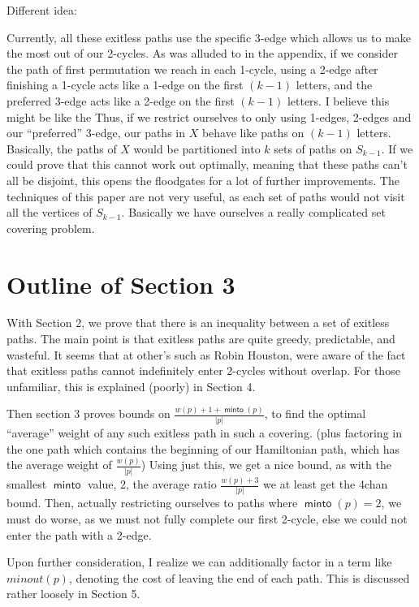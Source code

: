 \documentclass{article}
\DeclareMathOperator{\minto}{\bm{\mathsf{minto}}}
\begin{document}
Different idea:

Currently, all these exitless paths use the specific 3-edge which allows us to make the most out of our 2-cycles. As was alluded to in the appendix, if we consider the path of first permutation we reach in each 1-cycle, using a 2-edge after finishing a 1-cycle acts like a 1-edge on the first $(k-1)$ letters, and the preferred 3-edge acts like a 2-edge on the first $(k-1)$ letters. I believe this might be like the  Thus, if we restrict ourselves to only using 1-edges, 2-edges and our ``preferred'' 3-edge, our paths in $X$ behave like paths on $(k-1)$ letters. Basically, the paths of $X$ would be partitioned into $k$ sets of paths on $S_{k-1}$. If we could prove that this cannot work out optimally, meaning that these paths can't all be disjoint, this opens the floodgates for a lot of further improvements. The techniques of this paper are not very useful, as each set of paths would not visit all the vertices of $S_{k-1}$. Basically we have ourselves a really complicated set covering problem.

\section{Outline of Section 3}

With Section 2, we prove that there is an inequality between a set of exitless paths. The main point is that exitless paths are quite greedy, predictable, and wasteful. It seems that at other's such as Robin Houston, were aware of the fact that exitless paths cannot indefinitely enter 2-cycles without overlap. For those unfamiliar, this is explained (poorly) in Section 4.

Then section 3 proves bounds on $\frac{w(p) + 1+ \minto(p)}{|p|}$, to find the optimal ``average'' weight of any such exitless path in such a covering. (plus factoring in the one path which contains the beginning of our Hamiltonian path, which has the average weight of $\frac{w(p)}{|p|}$) Using just this, we get a nice bound, as with the smallest $\minto$ value, 2, the average ratio $\frac{w(p)+3}{|p|}$ we at least get the 4chan bound. Then, actually restricting ourselves to paths where $\minto(p)=2$, we must do worse, as we must not fully complete our first 2-cycle, else we could not enter the path with a 2-edge.

Upon further consideration, I realize we can additionally factor in a term like $minout(p)$, denoting the cost of leaving the end of each path. This is discussed rather loosely in Section 5.
\end{document}
